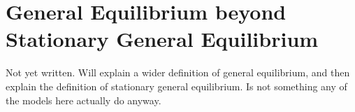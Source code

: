 \section{General Equilibrium beyond Stationary General Equilibrium} \label{app:eqmwithgrowth}
Not yet written. Will explain a wider definition of general equilibrium, and then explain the definition of stationary general equilibrium. Is not something any of the models here actually do anyway.





